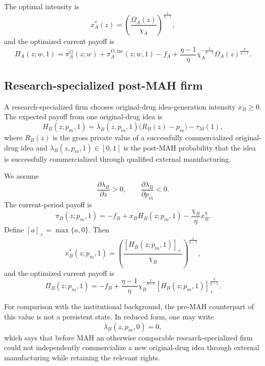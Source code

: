 \documentclass[12pt]{article}
\newcommand{\1}{\mathbf{1}}
\begin{document}
The optimal intensity is
\begin{equation}
x_A^*(z)=\left(\frac{\Omega_A(z)}{\chi_A}\right)^{\frac{1}{\eta-1}},
\label{eq:xA}
\end{equation}
and the optimized current payoff is
\begin{equation}
\Pi_A(z;w,1)
=
\pi_A^G(z;w)
+\pi_A^{O,\mathrm{inc}}(z;w,1)
-f_A
+\frac{\eta-1}{\eta}\chi_A^{-\frac{1}{\eta-1}}\Omega_A(z)^{\frac{\eta}{\eta-1}}.
\label{eq:PiA}
\end{equation}

\subsection{Research-specialized post-MAH firm}

A research-specialized firm chooses original-drug idea-generation intensity $x_B\ge 0$. The expected payoff from one original-drug idea is
\begin{equation}
H_B(z;p_m,1)=\lambda_B(z,p_m,1)\bigl(R_B(z)-p_m\bigr)-\tau_M(1),
\label{eq:HB}
\end{equation}
where $R_B(z)$ is the gross private value of a successfully commercialized original-drug idea and $\lambda_B(z,p_m,1)\in[0,1]$ is the post-MAH probability that the idea is successfully commercialized through qualified external manufacturing.

We assume
\begin{equation}
\frac{\partial \lambda_B}{\partial z}>0,
\qquad
\frac{\partial \lambda_B}{\partial p_m}<0.
\label{eq:lambda_monotone}
\end{equation}
The current-period payoff is
\begin{equation}
\pi_B(z;p_m,1)
=
-f_B+x_BH_B(z;p_m,1)-\frac{\chi_B}{\eta}x_B^{\eta}.
\label{eq:piB}
\end{equation}
Define $[a]_+=\max\{a,0\}$. Then
\begin{equation}
x_B^*(z;p_m,1)=\left(\frac{[H_B(z;p_m,1)]_+}{\chi_B}\right)^{\frac{1}{\eta-1}},
\label{eq:xB}
\end{equation}
and the optimized current payoff is
\begin{equation}
\Pi_B(z;p_m,1)
=
-f_B
+\frac{\eta-1}{\eta}\chi_B^{-\frac{1}{\eta-1}}[H_B(z;p_m,1)]_+^{\frac{\eta}{\eta-1}}.
\label{eq:PiB}
\end{equation}

For comparison with the institutional background, the pre-MAH counterpart of this value is not a persistent state. In reduced form, one may write
\begin{equation}
\lambda_B(z,p_m,0)=0,
\label{eq:lambdaB_pre_zero}
\end{equation}
which says that before MAH an otherwise comparable research-specialized firm could not independently commercialize a new original-drug idea through external manufacturing while retaining the relevant rights.
\end{document}

